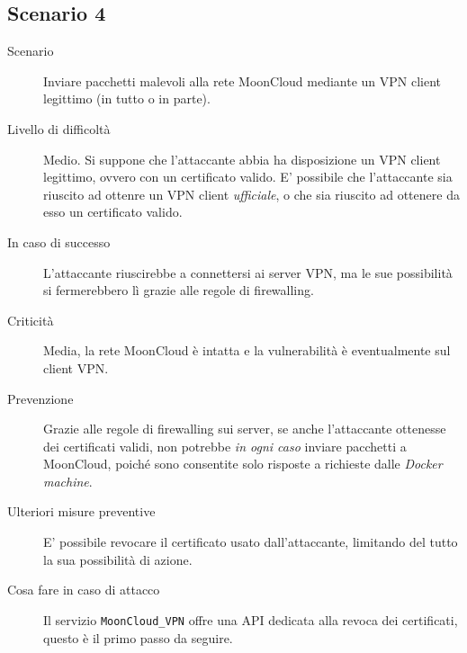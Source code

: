 \subsection{Scenario 4}
\begin{description}
    \item[Scenario]Inviare pacchetti malevoli alla rete MoonCloud
    mediante un VPN client legittimo (in tutto o in parte).
    \item[Livello di difficoltà]Medio. Si suppone che l'attaccante abbia
    ha disposizione un VPN client legittimo, ovvero con un certificato
    valido. E' possibile che l'attaccante sia riuscito ad ottenre un
    VPN client \textit{ufficiale}, o che sia riuscito ad ottenere
    da esso
    un certificato valido.
    \item[In caso di successo]L'attaccante riuscirebbe a connettersi
    ai server VPN, ma le sue possibilità si fermerebbero lì grazie
    alle regole di firewalling.
    \item[Criticità]Media, la rete MoonCloud è intatta e la vulnerabilità
    è eventualmente sul client VPN.
    \item[Prevenzione]Grazie alle regole di firewalling sui server,
    se anche l'attaccante ottenesse dei certificati validi, non
    potrebbe \textit{in ogni caso} inviare pacchetti a MoonCloud, poiché
    sono consentite solo risposte a richieste dalle \textit{Docker machine}. 
    \item[Ulteriori misure preventive]E' possibile revocare il certificato
    usato dall'attaccante, limitando del tutto la sua possibilità di azione.
    \item[Cosa fare in caso di attacco]Il servizio  \texttt{MoonCloud\_VPN}
    offre una API dedicata alla revoca dei certificati, questo è il primo
    passo da seguire.
\end{description}

